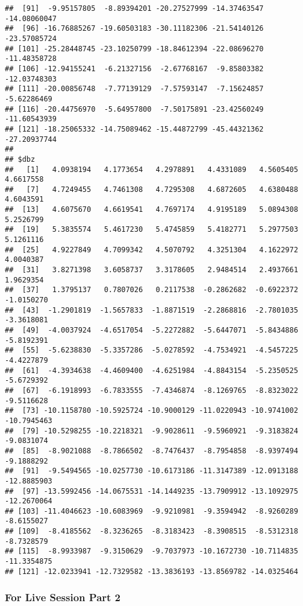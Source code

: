 \documentclass[
]{article}
\begin{document}
\begin{verbatim}
##  [91]  -9.95157805  -8.89394201 -20.27527999 -14.37463547 -14.08060047
##  [96] -16.76885267 -19.60503183 -30.11182306 -21.54140126 -23.57085724
## [101] -25.28448745 -23.10250799 -18.84612394 -22.08696270 -11.48358728
## [106] -12.94155241  -6.21327156  -2.67768167  -9.85803382 -12.03748303
## [111] -20.00856748  -7.77139129  -7.57593147  -7.15624857  -5.62286469
## [116] -20.44756970  -5.64957800  -7.50175891 -23.42560249 -11.60543939
## [121] -18.25065332 -14.75089462 -15.44872799 -45.44321362 -27.20937744
## 
## $dbz
##   [1]   4.0938194   4.1773654   4.2978891   4.4331089   4.5605405   4.6617558
##   [7]   4.7249455   4.7461308   4.7295308   4.6872605   4.6380488   4.6043591
##  [13]   4.6075670   4.6619541   4.7697174   4.9195189   5.0894308   5.2526799
##  [19]   5.3835574   5.4617230   5.4745859   5.4182771   5.2977503   5.1261116
##  [25]   4.9227849   4.7099342   4.5070792   4.3251304   4.1622972   4.0040387
##  [31]   3.8271398   3.6058737   3.3178605   2.9484514   2.4937661   1.9629354
##  [37]   1.3795137   0.7807026   0.2117538  -0.2862682  -0.6922372  -1.0150270
##  [43]  -1.2901819  -1.5657833  -1.8871519  -2.2868816  -2.7801035  -3.3618081
##  [49]  -4.0037924  -4.6517054  -5.2272882  -5.6447071  -5.8434886  -5.8192391
##  [55]  -5.6238830  -5.3357286  -5.0278592  -4.7534921  -4.5457225  -4.4227879
##  [61]  -4.3934638  -4.4609400  -4.6251984  -4.8843154  -5.2350525  -5.6729392
##  [67]  -6.1918993  -6.7833555  -7.4346874  -8.1269765  -8.8323022  -9.5116628
##  [73] -10.1158780 -10.5925724 -10.9000129 -11.0220943 -10.9741002 -10.7945463
##  [79] -10.5298255 -10.2218321  -9.9028611  -9.5960921  -9.3183824  -9.0831074
##  [85]  -8.9021088  -8.7866502  -8.7476437  -8.7954858  -8.9397494  -9.1888292
##  [91]  -9.5494565 -10.0257730 -10.6173186 -11.3147389 -12.0913188 -12.8885903
##  [97] -13.5992456 -14.0675531 -14.1449235 -13.7909912 -13.1092975 -12.2670064
## [103] -11.4046623 -10.6083969  -9.9210981  -9.3594942  -8.9260289  -8.6155027
## [109]  -8.4185562  -8.3236265  -8.3183423  -8.3908515  -8.5312318  -8.7328579
## [115]  -8.9933987  -9.3150629  -9.7037973 -10.1672730 -10.7114835 -11.3354875
## [121] -12.0233941 -12.7329582 -13.3836193 -13.8569782 -14.0325464
\end{verbatim}

\hypertarget{for-live-session-part-2}{%
\subsubsection{For Live Session Part 2}\label{for-live-session-part-2}}
\end{document}
